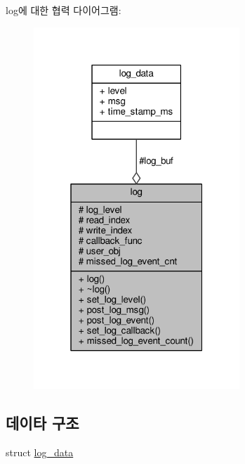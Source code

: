 log에 대한 협력 다이어그램\+:
\nopagebreak
\begin{figure}[H]
\begin{center}
\leavevmode
\includegraphics[width=220pt]{classavdecc__lib_1_1log__coll__graph}
\end{center}
\end{figure}
\subsection*{데이타 구조}
\begin{DoxyCompactItemize}
\item 
struct \hyperlink{structavdecc__lib_1_1log_1_1log__data}{log\+\_\+data}
\end{DoxyCompactItemize}
